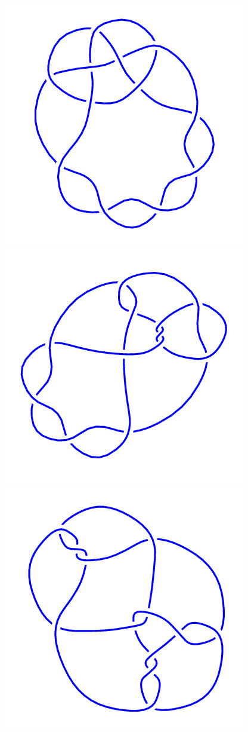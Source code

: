 \documentclass[reqno]{amsart}
\theoremstyle{definition}
\begin{document}
\begin{center}
 \includegraphics[scale=0.2]{../images/12n_0666.png}\hspace{3em}
 \includegraphics[scale=0.2]{../images/12n_0673.png}\hspace{3em}
 \includegraphics[scale=0.2]{../images/12n_0680.png}
\end{center}
\end{document}
